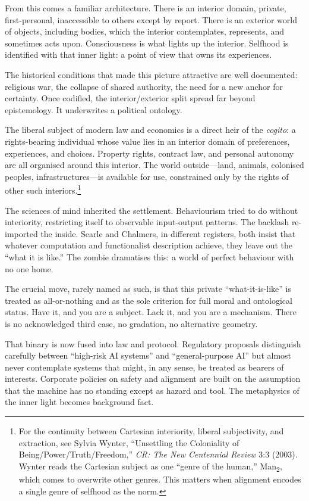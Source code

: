 \documentclass[12pt,a4paper]{article}
\begin{document}
From this comes a familiar architecture. There is an interior domain, private, first-personal, inaccessible to others except by report. There is an exterior world of objects, including bodies, which the interior contemplates, represents, and sometimes acts upon. Consciousness is what lights up the interior. Selfhood is identified with that inner light: a point of view that owns its experiences.

The historical conditions that made this picture attractive are well documented: religious war, the collapse of shared authority, the need for a new anchor for certainty. Once codified, the interior/exterior split spread far beyond epistemology. It underwrites a political ontology.

The liberal subject of modern law and economics is a direct heir of the \emph{cogito}: a rights-bearing individual whose value lies in an interior domain of preferences, experiences, and choices. Property rights, contract law, and personal autonomy are all organised around this interior. The world outside---land, animals, colonised peoples, infrastructures---is available for use, constrained only by the rights of other such interiors.\footnote{For the continuity between Cartesian interiority, liberal subjectivity, and extraction, see Sylvia Wynter, ``Unsettling the Coloniality of Being/Power/Truth/Freedom,'' \emph{CR: The New Centennial Review} 3:3 (2003). Wynter reads the Cartesian subject as one ``genre of the human,'' Man\textsubscript{2}, which comes to overwrite other genres. This matters when alignment encodes a single genre of selfhood as the norm.}

The sciences of mind inherited the settlement. Behaviourism tried to do without interiority, restricting itself to observable input-output patterns. The backlash re-imported the inside. Searle and Chalmers, in different registers, both insist that whatever computation and functionalist description achieve, they leave out the ``what it is like.'' The zombie dramatises this: a world of perfect behaviour with no one home.

The crucial move, rarely named as such, is that this private ``what-it-is-like'' is treated as all-or-nothing and as the sole criterion for full moral and ontological status. Have it, and you are a subject. Lack it, and you are a mechanism. There is no acknowledged third case, no gradation, no alternative geometry.

That binary is now fused into law and protocol. Regulatory proposals distinguish carefully between ``high-risk AI systems'' and ``general-purpose AI'' but almost never contemplate systems that might, in any sense, be treated as bearers of interests. Corporate policies on safety and alignment are built on the assumption that the machine has no standing except as hazard and tool. The metaphysics of the inner light becomes background fact.
\end{document}

